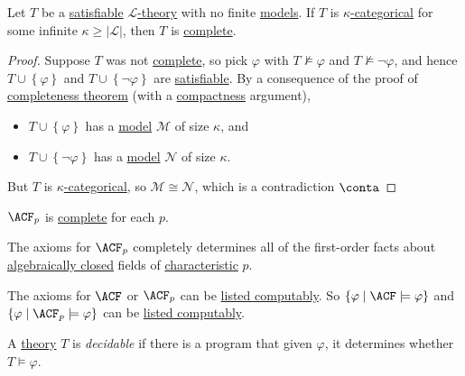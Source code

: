 \begin{theorem}\label{thm:Vaugh-test}
	Let \(T\) be a \hyperref[def:satisfiable]{satisfiable} \hyperref[def:theory]{\(\mathcal{L} \)-theory} with no finite \hyperref[def:model]{models}. If \(T\) is \hyperref[def:categorical]{\(\kappa \)-categorical} for some infinite \(\kappa \geq \vert \mathcal{L}  \vert \), then \(T\) is \hyperref[def:theory-complete]{complete}.
\end{theorem}
\begin{proof}
	Suppose \(T\) was not \hyperref[def:theory-complete]{complete}, so pick \(\varphi \) with \(T \not \models \varphi \) and \(T \not \models \lnot \varphi \), and hence \(T \cup \left\{ \varphi  \right\} \) and \(T \cup \left\{ \lnot \varphi  \right\} \) are \hyperref[def:satisfiable]{satisfiable}. By a consequence of the proof of \hyperref[thm:completeness]{completeness theorem} (with a \hyperref[thm:compactness]{compactness} argument),
	\begin{itemize}
		\item \(T \cup \left\{ \varphi  \right\} \) has a \hyperref[def:model]{model} \(\mathcal{M} \) of size \(\kappa \), and
		\item \(T \cup \left\{ \lnot \varphi  \right\} \) has a \hyperref[def:model]{model} \(\mathcal{N} \) of size \(\kappa \).
	\end{itemize}
	But \(T\) is \hyperref[def:categorical]{\(\kappa \)-categorical}, so \(\mathcal{M} \cong \mathcal{N} \), which is a contradiction \(\conta\)
\end{proof}

\begin{corollary}
	\(\ACF_p\) is \hyperref[def:theory-complete]{complete} for each \(p\).
\end{corollary}

The axioms for \(\ACF_p \) completely determines all of the first-order facts about \hyperref[def:algebraically-closed]{algebraically closed} fields of \hyperref[def:characteristic]{characteristic} \(p\).

\begin{remark}[Fact]
	The axioms for \(\ACF \) or \(\ACF_p \) can be \hyperref[def:computably-enumerable]{listed computably}. So \(\left\{ \varphi \mid \ACF \models \varphi \right\} \) and \(\left\{ \varphi \mid \ACF_p \models \varphi \right\} \) can be \hyperref[def:computably-enumerable]{listed computably}.
\end{remark}

\begin{definition}[Decidable]\label{def:decidable}
	A \hyperref[def:theory]{theory} \(T\) is \emph{decidable} if there is a program that given \(\varphi \), it determines whether \(T \models \varphi \).
\end{definition}

